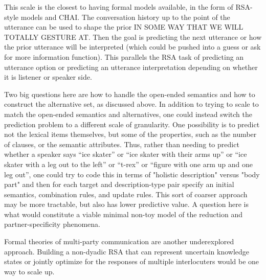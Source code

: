\documentclass[]{article}
\begin{document}
	This scale is the closest to having formal models available, in the form of RSA-style models and CHAI. The conversation history up to the point of the utterance can be used to shape the prior IN SOME WAY THAT WE WILL TOTALLY GESTURE AT. Then the goal is predicting the next utterance or how the prior utterance will be interpreted (which could be pushed into a guess or ask for more information function). This parallels the RSA task of predicting an utterance option or predicting an utterance interpretation depending on whether it is listener or speaker side. 
	
	Two big questions here are how to handle the open-ended semantics and how to construct the alternative set, as discussed above. In addition to trying to scale to match the open-ended semantics and alternatives, one could instead switch the prediction problem to a different scale of granularity. One possibility is to predict not the lexical items themselves, but some of the properties, such as the number of clauses, or the semantic attributes. Thus, rather than needing to predict whether a speaker says ``ice skater'' or ``ice skater with their arms up'' or ``ice skater with a leg out to the left'' or ``t-rex'' or ``figure with one arm up and one leg out'', one could try to code this in terms of "holistic description" versus "body part" and then for each target and description-type pair specify an initial semantics, combination rules, and update rules. This sort of coarser approach may be more tractable, but also has lower predictive value. A question here is what would constitute a viable minimal non-toy model of the reduction and partner-specificity phenomena. 
	
	
	Formal theories of multi-party communication are another underexplored approach. Building a non-dyadic RSA that can represent uncertain knowledge states or jointly optimize for the responses of multiple interlocuters would be one way to scale up. 
	
\end{document}
